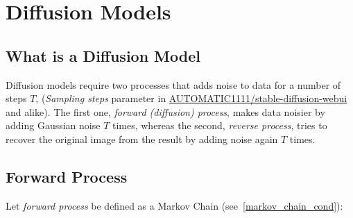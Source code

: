 \documentclass{book}
\numberwithin{equation}{subsection}
\begin{document}
\section{Diffusion Models}
\subsection{What is a Diffusion Model}

Diffusion models require two processes that adds noise to data for a number of steps $T$, (\textit{Sampling steps} parameter in \href{https://github.com/AUTOMATIC1111/stable-diffusion-webui}{AUTOMATIC1111/stable-diffusion-webui} and alike). The first one, \textit{forward (diffusion) process}, makes data noisier by adding Gaussian noise $T$ times, whereas the second, \textit{reverse process}, tries to recover the original image from the result by adding noise again $T$ times. 
\subsection{Forward Process}
Let \textit{forward process} be defined as a Markov Chain (see~\ref{markov_chain_cond}):
\end{document}

